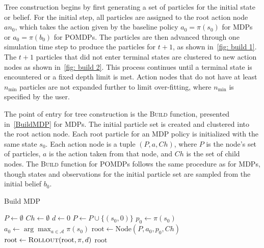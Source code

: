 \documentclass[letterpaper]{article} %
\begin{document}
Tree construction begins by first generating a set of particles for the initial state or belief.
For the initial step, all particles are assigned to the root action node $an_0$, which takes the action given by the baseline policy $a_0 = \pi(s_0)$ for MDPs or $a_0 = \pi(b_0)$ for POMDPs.
The particles are then advanced through one simulation time step to produce the particles for $t+1$, as shown in~\cref{fig: build 1}.
The $t+1$ particles that did not enter terminal states are clustered to new action nodes as shown in~\cref{fig: build 2}.
This process continues until a terminal state is encountered or a fixed depth limit is met.
Action nodes that do not have at least $n_{\min}$ particles are not expanded further to limit over-fitting, where $n_{\min}$ is specified by the user.

The point of entry for tree construction is the \textsc{Build} function, presented in~\cref{BuildMDP} for MDPs.
The initial particle set is created and clustered into the root action node.
Each root particle for an MDP policy is initialized with the same state $s_0$.
Each action node is a tuple $(P, a, Ch)$, where $P$ is the node's set of particles, $a$ is the action taken from that node, and $Ch$ is the set of child nodes.
The \textsc{Build} function for POMDPs follows the same procedure as for MDPs, though states and observations for the initial particle set are sampled from the initial belief $b_0$.
\begin{algorithm}[htb]
\caption{Build MDP}\label{BuildMDP}
\begin{algorithmic}[1]
\State $P \gets \emptyset$
\State $Ch \gets \emptyset$
\State $d \gets 0$
\State $P \gets P \cup \{ (s_0, 0) \}$
\EndFor
\State $p_0 \gets \pi(s_0)$
\State $a_0 \gets \arg\max_{a \in \mathcal{A}} \pi(s_0)$
\State $\text{root} \gets \text{Node}(P, a_0, p_0, Ch)$
\State $\text{root} \gets \textsc{Rollout}(\text{root}, \pi, d)$
\State \Return $\text{root}$
\EndProcedure
\end{algorithmic}
\end{algorithm}
\end{document}
